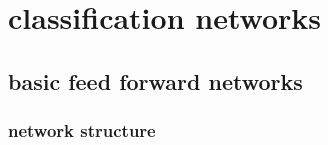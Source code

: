 \documentclass[msc]{infthesis}
\begin{document}
\chapter{classification networks}
\label{sec:classification}




\section{basic feed forward networks}
\label{sec:classification:1}





\subsection{network structure}
\label{sec:classification:feed-forward:structure}
\end{document}
